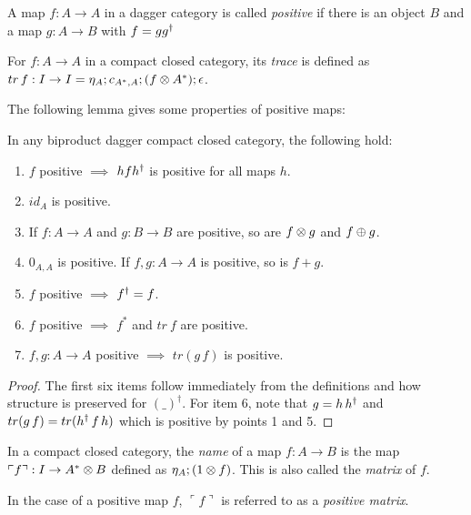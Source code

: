 \begin{definition}\label{def:positivemap}
  A map $f:A\to A$ in a dagger category is called \emph{positive} if there is an object $B$ and a
  map $g:A\to B$ with $f = g {g}^{\dagger}$
\end{definition}

\begin{definition}[Trace]\label{def:tracecp}
  For $f:A\to A$ in a compact closed category, its \emph{trace} is defined as $tr\, f:I\to I =
  \eta_{A} ; c_{A^{*},A} ; (f\otimes A^{*}) ; \epsilon$.
\end{definition}

The following lemma gives some properties of positive maps:

\begin{lemma}\label{lemma:positivemaps}
  In any biproduct dagger compact closed category, the following hold:
  \begin{enumerate}
    \item{} $f$ positive $\implies$ $h f {h}^{\dagger}$ is positive for all maps $h$.
    \item{} $id_{A}$ is positive.
    \item If $f:A\to A$ and $g:B\to B$ are positive, so are $f\otimes g$ and $f\oplus g$.
    \item $0_{A,A}$ is positive. If $f,g:A\to A$ is positive, so is $f+g$.
    \item $f$ positive $\implies$ ${f}^{\dagger}=f$.
    \item $f$ positive $\implies$ $f^{*}$ and $tr\ f$ are positive.
    \item $f,g:A\to A$ positive $\implies$ $tr (g\,f)$ is positive.
  \end{enumerate}
\end{lemma}
\begin{proof}
  The first six items follow immediately from the definitions and how structure is preserved for
  $(\_)^{\dagger}$. For item 6, note that $g = h\, {h}^{\dagger}$ and $tr(g\,f) = tr({h}^{\dagger}\,f\,h)$
  which is positive by points 1 and 5.%
\end{proof}

\begin{definition}\label{def:name}
  In a compact closed category, the \emph{name} of a map $f:A\to B$ is the map $\ulcorner f
  \urcorner:I \to A^{*} \otimes B$ defined as $\eta_{A}; (1\otimes f)$. This is also called the \emph{matrix} of
  $f$.
\end{definition}

In the case of a positive map $f$, $\ulcorner f \urcorner$ is referred to as a \emph{positive
matrix}.

